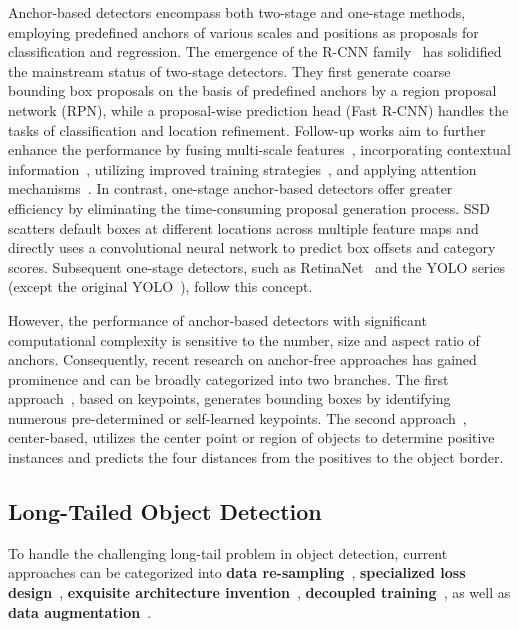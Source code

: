 \documentclass[lettersize,journal]{IEEEtran}
\begin{document}
Anchor-based detectors encompass both two-stage and one-stage methods, employing predefined anchors of various scales and positions as proposals for classification and regression.
The emergence of the R-CNN family~\cite{girshick2014rich,girshick2015fast,ren2015faster,cai2018cascade} has solidified the mainstream status of two-stage detectors.
They first generate coarse bounding box proposals on the basis of predefined anchors by a region proposal network (RPN), while a proposal-wise prediction head (Fast R-CNN) handles the tasks of classification and location refinement.
Follow-up works aim to further enhance the performance by fusing multi-scale features~\cite{lin2017feature}, incorporating contextual information~\cite{bell2016inside}, utilizing improved training strategies~\cite{shrivastava2016training,dai2017deformable,zhu2019deformable}, and applying attention mechanisms~\cite{hu2018squeeze,cao2019gcnet,zhu2019empirical}.
In contrast, one-stage anchor-based detectors offer greater efficiency by eliminating the time-consuming proposal generation process.
SSD~\cite{liu2016ssd} scatters default boxes at different locations across multiple feature maps and directly uses a convolutional neural network to predict box offsets and category scores.
Subsequent one-stage detectors, such as RetinaNet~\cite{lin2017focal} and the YOLO series~\cite{redmon2017yolo9000,redmon2018yolov3,bochkovskiy2020yolov4} (except the original YOLO~\cite{redmon2016you}), follow this concept.


However, the performance of anchor-based detectors with significant computational complexity is sensitive to the number, size and aspect ratio of anchors.
Consequently, recent research on anchor-free approaches has gained prominence and can be broadly categorized into two branches.
The first approach~\cite{law2018cornernet,zhou2019bottom}, based on keypoints, generates bounding boxes by identifying numerous pre-determined or self-learned keypoints.
The second approach~\cite{redmon2016you,kong2020foveabox,tian2020fcos}, center-based, utilizes the center point or region of objects to determine positive instances and predicts the four distances from the positives to the object border.



\subsection{Long-Tailed Object Detection}
To handle the challenging long-tail problem in object detection, current approaches can be categorized into \textbf{data re-sampling}~\cite{shen2016relay,gupta2019lvis,chang2021image}, \textbf{specialized loss design}~\cite{cui2019class,tan2020equalization,tan2021equalization,wang2021adaptive,wang2021seesaw,feng2021exploring}, \textbf{exquisite architecture invention}~\cite{li2020overcoming,wu2020forest}, \textbf{decoupled training}~\cite{wang2020devil,li2020overcoming,zhang2021distribution,wang2021adaptive,feng2021exploring}, as well as \textbf{data augmentation}~\cite{ghiasi2021simple,zang2021fasa}.
\end{document}
